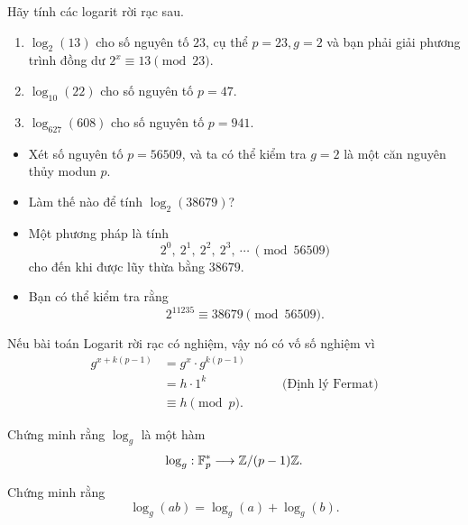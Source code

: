 \begin{frame}
  \begin{xrcs}
    Hãy tính các logarit rời rạc sau.
    \begin{enumerate}
    \item $\log_2(13)$ cho số nguyên tố $23$, cụ thể $p=23, g=2$ và bạn phải giải phương trình đồng dư $2^x\equiv 13\pmod{23}$.
    \item $\log_{10}(22)$ cho số nguyên tố $p = 47$.
    \item $\log_{627}(608)$ cho số nguyên tố $p =941$.
    \end{enumerate}
  \end{xrcs}
\end{frame}
\begin{frame}
  \begin{xmpl}
    \begin{itemize}
    \item<+-> Xét số nguyên tố $p = 56509$, và ta có thể kiểm tra $g=2$ là
      một căn nguyên thủy modun $p$. 
    \item<+-> Làm thế nào để tính
      $\log_2(38679)$?  
    \item<+-> Một phương pháp là tính
    $$
    2^0,\ 2^1,\ 2^2,\ 2^3,\ \cdots\ \pmod{56509}
    $$
    cho đến khi được lũy thừa bằng $38679$. 
  \item<+-> Bạn có thể kiểm tra rằng
    $$
    2^{11235} \equiv 38679 \pmod{56509}.
    $$
  \end{itemize}
  \end{xmpl}
\end{frame}
\begin{frame}
  \begin{rmrk}
    Nếu bài toán Logarit rời rạc có nghiệm, vậy nó có vố số nghiệm vì 
    \begin{align*}
    g^{x + k(p-1)} &= g^x\cdot g^{k(p-1)}\\      
                &=h \cdot 1^k  \qquad \qquad\qquad   \text{(Định lý Fermat)}\\
                &\equiv h \pmod{p}. 
    \end{align*}
  \end{rmrk}
\end{frame}

\begin{frame}
  \begin{xrcs}
    Chứng minh rằng $\log_g$ là một hàm 
    $$
    \log_g : \mathbb{F}_p^* \longrightarrow \mathbb{Z}/(p-1)\mathbb{Z}.
    $$
  \end{xrcs}
\end{frame}
\begin{frame}
  \begin{xrcs}
    Chứng minh rằng 
    $$
    \log_g(ab) = \log_g(a) + \log_g(b).
    $$
  \end{xrcs}
\end{frame}

